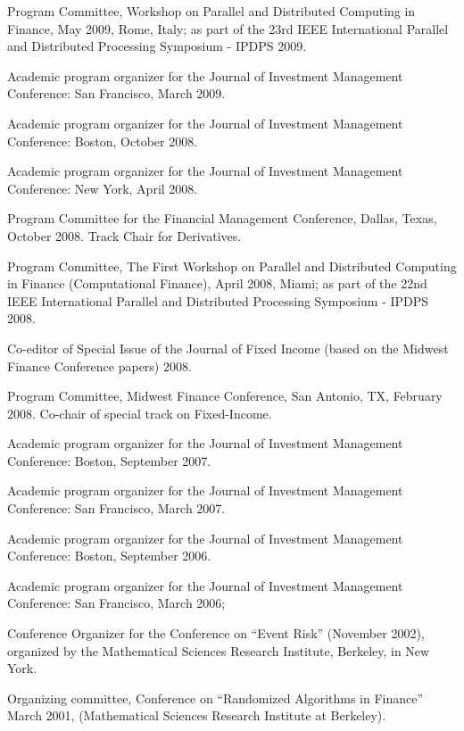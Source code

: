 \documentclass{article}
\begin{document}
\begin{description}
\begin{etaremune}
\item Program Committee, Workshop on Parallel and Distributed Computing in Finance, May 2009, Rome, Italy; as part of the 23rd IEEE International Parallel and Distributed Processing Symposium - IPDPS 2009.

\item Academic program organizer for the Journal of Investment Management Conference: San Francisco, March 2009.

\item Academic program organizer for the Journal of Investment Management Conference: Boston, October 2008. 

\item Academic program organizer for the Journal of Investment Management Conference: New York, April 2008. 

\item Program Committee for the Financial Management Conference, Dallas, Texas, October 2008. Track Chair for Derivatives. 
 
\item Program Committee, The First Workshop on Parallel and Distributed Computing in Finance (Computational Finance), April 2008, Miami; as part of the 22nd IEEE International Parallel and Distributed Processing Symposium - IPDPS 2008.

\item Co-editor of Special Issue of the Journal of Fixed Income (based on the Midwest Finance Conference papers) 2008.

\item Program Committee, Midwest Finance Conference, San Antonio, TX, February 2008. Co-chair of special track on Fixed-Income.

\item Academic program organizer for the Journal of Investment Management Conference: Boston, September 2007. 

\item Academic program organizer for the Journal of Investment Management Conference: San Francisco, March 2007.

\item Academic program organizer for the Journal of Investment Management Conference: Boston, September 2006. 

\item Academic program organizer for the Journal of Investment Management Conference: San Francisco, March 2006; 

\item Conference Organizer for the Conference on ``Event Risk'' (November 2002), organized by the Mathematical Sciences Research Institute, Berkeley, in New York.

\item Organizing committee, Conference on ``Randomized Algorithms in Finance'' March 2001, (Mathematical Sciences Research Institute at Berkeley).

\end{etaremune}

\end{description}
\end{document}
